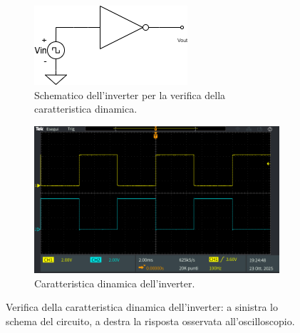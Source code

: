\documentclass[a4paper,12pt]{article}
\begin{document}
\begin{figure}[H]
    \centering
    
    \begin{subfigure}[b]{0.45\textwidth}
        \centering
        \includegraphics[width=\linewidth]{immagini/inverter/circuitoLogico1NoLed.png}
        \caption{Schematico dell'inverter per la verifica della caratteristica dinamica.}
        \label{fig:inverterDinamica}
    \end{subfigure}
    \hfill
    \begin{subfigure}[b]{0.45\textwidth}
        \centering
        \includegraphics[width=\linewidth]{immagini/inverter/TEK00099.PNG}
        \caption{Caratteristica dinamica dell'inverter.}
        \label{grafico}
    \end{subfigure}
    \caption{Verifica della caratteristica dinamica dell'inverter: a sinistra lo schema del circuito, a destra la risposta osservata all'oscilloscopio.}
    \label{fig:inverterDinamica}
\end{figure}
\end{document}
